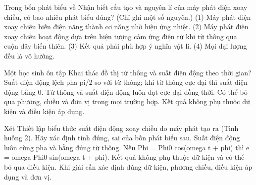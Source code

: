 \begin{ex}
Trong bốn phát biểu về Nhận biết cấu tạo và nguyên lí của máy phát điện xoay chiều, có bao nhiêu phát biểu đúng? (Chỉ ghi một số nguyên.) (1) Máy phát điện xoay chiều biến điện năng thành cơ năng nhờ hiệu ứng nhiệt. (2) Máy phát điện xoay chiều hoạt động dựa trên hiện tượng cảm ứng điện từ khi từ thông qua cuộn dây biến thiên. (3) Kết quả phải phù hợp ý nghĩa vật lí. (4) Mọi đại lượng đều là vô hướng.
\end{ex}

\begin{ex}
Một học sinh ôn tập Khai thác đồ thị từ thông và suất điện động theo thời gian?
\choice
{\True Suất điện động lệch pha pi/2 so với từ thông; khi từ thông cực đại thì suất điện động bằng 0.}
{Từ thông và suất điện động luôn đạt cực đại đồng thời.}
{Có thể bỏ qua phương, chiều và đơn vị trong mọi trường hợp.}
{Kết quả không phụ thuộc dữ kiện và điều kiện áp dụng.}
\end{ex}

\begin{ex}
Xét Thiết lập biểu thức suất điện động xoay chiều do máy phát tạo ra (Tình huống 2). Hãy xác định tính đúng, sai của bốn phát biểu sau.
\choiceTF
{Suất điện động luôn cùng pha và bằng đúng từ thông.}
{\True Nếu Phi = Phi0 cos(omega t + phi) thì e = omega Phi0 sin(omega t + phi).}
{Kết quả không phụ thuộc dữ kiện và có thể bỏ qua điều kiện.}
{\True Khi giải cần xác định đúng dữ kiện, phương chiều, điều kiện áp dụng và đơn vị.}
\end{ex}

